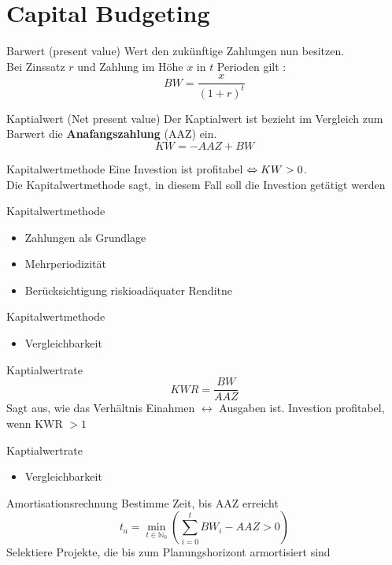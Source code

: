 \section{Capital Budgeting}
\begin{defi}{Barwert (present value)}
	Wert den zukünftige Zahlungen nun besitzen.\\
	Bei Zinssatz $r$ und Zahlung im Höhe $x$ in $t$ Perioden gilt :\\
	$$BW =  \frac{x}{(1+r)^t} $$
\end{defi}
\begin{defi}{Kaptialwert (Net present value)}
	Der Kaptialwert ist bezieht im Vergleich zum Barwert die \textbf{Anafangszahlung} (AAZ) ein. 
	$$ KW = -AAZ + BW$$
\end{defi}
\begin{defi}{Kapitalwertmethode}
	Eine Investion ist profitabel $\boldmath{	\Leftrightarrow KW > 0}$. \\Die Kapitalwertmethode sagt, in diesem Fall soll die Investion getätigt werden
\end{defi}
\begin{why}{Kapitalwertmethode}
	\begin{itemize}
		\item Zahlungen als Grundlage
		\item Mehrperiodizität
		\item Berücksichtigung riskioadäquater Renditne
	\end{itemize}
\end{why}
\begin{whynot}{Kapitalwertmethode}
	\begin{itemize}
		\item Vergleichbarkeit
	\end{itemize}
\end{whynot}
\begin{defi}{Kaptialwertrate}
	$$KWR = \frac{BW}{AAZ}$$
	Sagt aus, wie das Verhältnis Einahmen $\leftrightarrow$ Ausgaben ist.
	Investion profitabel, wenn KWR $> 1$
\end{defi}
\begin{why}{Kaptialwertrate}
	\begin{itemize}
		\item Vergleichbarkeit
	\end{itemize}
\end{why}
\begin{defi}{Amortisationsrechnung}
	Bestimme Zeit, bis AAZ erreicht
	$$ t_a = \min_{t \in \mathbb{N}_0}{(\sum_{i=0}^{t}{BW_i} - AAZ > 0)} $$
	Selektiere Projekte, die bis zum Planungshorizont armortisiert sind
\end{defi}
